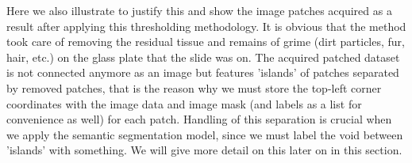 \documentclass[a4paper,12pt]{article}
\begin{document}
\par Here we also illustrate to justify this and show the image patches acquired as a result after applying this thresholding methodology. It is obvious that the method took care of removing the residual tissue and remains of grime (dirt particles, fur, hair, etc.) on the glass plate that the slide was on. The acquired patched dataset is not connected anymore as an image but features 'islands' of patches separated by removed patches, that is the reason why we must store the top-left corner coordinates with the image data and image mask (and labels as a list for convenience as well) for each patch. Handling of this separation is crucial when we apply the semantic segmentation model, since we must label the void between 'islands' with something. We will give more detail on this later on in this section.

\vspace{4mm}
\end{document}
